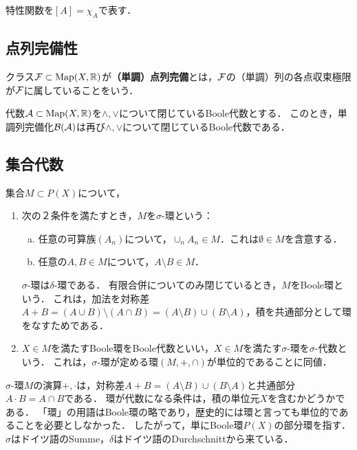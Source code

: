 \documentclass[uplatex,dvipdfmx]{jsreport}
\begin{document}
\begin{notation}
    特性関数を$[A]=\chi_A$で表す．
\end{notation}

\subsection{点列完備性}

\begin{definition}
    クラス$\mathcal{F}\subset\mathrm{Map}(X,\mathbb{R})$が\textbf{（単調）点列完備}とは，$\mathcal{F}$の（単調）列の各点収束極限が$\mathcal{F}$に属していることをいう．
\end{definition}

\begin{lemma}\label{lemma-sequential-completion}
    代数$\mathcal{A}\subset\mathrm{Map}(X,\mathbb{R})$を$\land,\lor$について閉じているBoole代数とする．
    このとき，単調列完備化$\mathcal{B}(\mathcal{A})$は再び$\land,\lor$について閉じているBoole代数である．
\end{lemma}

\subsection{集合代数}

\begin{definition}
    集合$M\subset P(X)$について，
    \begin{enumerate}
        \item 次の２条件を満たすとき，$M$を$\sigma$-環という：
        \begin{enumerate}[(a)]
            \item 任意の可算族$(A_n)$について，$\cup_{n}A_n\in M$．これは$\emptyset\in M$を含意する．
            \item 任意の$A,B\in M$について，$A\setminus B\in M$．
        \end{enumerate}
        $\sigma$-環は$\delta$-環である．
        有限合併についてのみ閉じているとき，$M$をBoole環という．
        これは，加法を対称差$A+B=(A\cup B)\setminus(A\cap B)=(A\setminus B)\cup(B\setminus A)$，積を共通部分として環をなすためである．
        \item $X\in M$を満たすBoole環をBoole代数といい，$X\in M$を満たす$\sigma$-環を$\sigma$-代数という．
        これは，$\sigma$-環が定める環$(M,+,\cap)$が単位的であることに同値．
    \end{enumerate}
\end{definition}
\begin{remarks}
    $\sigma$-環$M$の演算$+,\cdot$は，対称差$A+B=(A\setminus B)\cup(B\setminus A)$と共通部分$A\cdot B=A\cap B$である．
    環が代数になる条件は，積の単位元$X$を含むかどうかである．
    「環」の用語はBoole環の略であり，歴史的には環と言っても単位的であることを必要としなかった．
    したがって，単にBoole環$P(X)$の部分環を指す．
    $\sigma$はドイツ語のSumme，$\delta$はドイツ語のDurchschnittから来ている．
\end{remarks}
\end{document}
